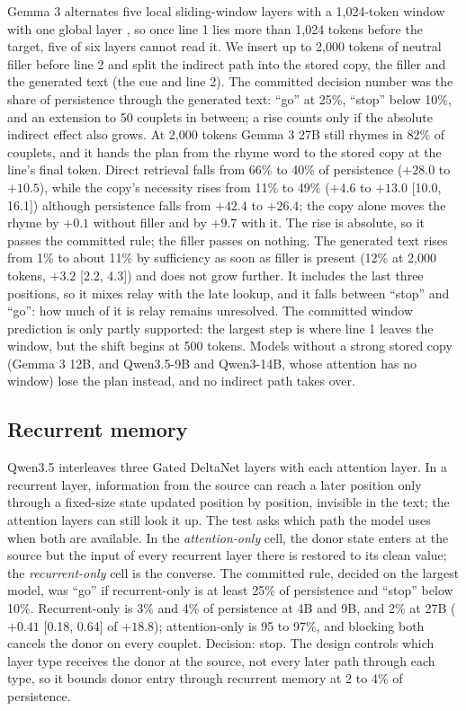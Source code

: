 \documentclass[
]{article}
\begin{document}
Gemma 3 alternates five local sliding-window layers
\citep{beltagy2020longformer} with a 1,024-token window with one global
layer \citep{gemma3}, so once line 1 lies more than 1,024 tokens before
the target, five of six layers cannot read it. We insert up to 2,000
tokens of neutral filler before line 2 and split the indirect path into
the stored copy, the filler and the generated text (the cue and line 2).
The committed decision number was the share of persistence through the
generated text: ``go'' at 25\%, ``stop'' below 10\%, and an extension to
50 couplets in between; a rise counts only if the absolute indirect
effect also grows. At 2,000 tokens Gemma 3 27B still rhymes in 82\% of
couplets, and it hands the plan from the rhyme word to the stored copy
at the line's final token. Direct retrieval falls from 66\% to 40\% of
persistence (\(+28.0\) to \(+10.5\)), while the copy's necessity rises
from 11\% to 49\% (\(+4.6\) to \(+13.0\) {[}10.0, 16.1{]}) although
persistence falls from \(+42.4\) to \(+26.4\); the copy alone moves the
rhyme by \(+0.1\) without filler and by \(+9.7\) with it. The rise is
absolute, so it passes the committed rule; the filler passes on nothing.
The generated text rises from 1\% to about 11\% by sufficiency as soon
as filler is present (12\% at 2,000 tokens, \(+3.2\) {[}2.2, 4.3{]}) and
does not grow further. It includes the last three positions, so it mixes
relay with the late lookup, and it falls between ``stop'' and ``go'':
how much of it is relay remains unresolved. The committed window
prediction is only partly supported: the largest step is where line 1
leaves the window, but the shift begins at 500 tokens. Models without a
strong stored copy (Gemma 3 12B, and Qwen3.5-9B and Qwen3-14B, whose
attention has no window) lose the plan instead, and no indirect path
takes over.

\subsection{Recurrent memory}\label{sec-recurrent}

Qwen3.5 \citep{qwen2026qwen35} interleaves three Gated DeltaNet layers
\citep{yang2025gateddeltanet} with each attention layer. In a recurrent
layer, information from the source can reach a later position only
through a fixed-size state updated position by position, invisible in
the text; the attention layers can still look it up. The test asks which
path the model uses when both are available. In the
\emph{attention-only} cell, the donor state enters at the source but the
input of every recurrent layer there is restored to its clean value; the
\emph{recurrent-only} cell is the converse. The committed rule, decided
on the largest model, was ``go'' if recurrent-only is at least 25\% of
persistence and ``stop'' below 10\%. Recurrent-only is 3\% and 4\% of
persistence at 4B and 9B, and 2\% at 27B (\(+0.41\) {[}0.18, 0.64{]} of
\(+18.8\)); attention-only is 95 to 97\%, and blocking both cancels the
donor on every couplet. Decision: stop. The design controls which layer
type receives the donor at the source, not every later path through each
type, so it bounds donor entry through recurrent memory at 2 to 4\% of
persistence.
\end{document}
